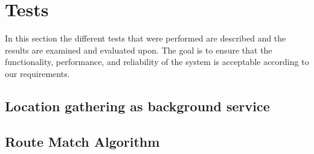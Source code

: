 \section{Tests}\label{sub:s3test}
In this section the different tests that were performed are described and the results are examined and evaluated upon.
The goal is to ensure that the functionality, performance, and reliability of the system is acceptable according to our requirements.

\subsection{Location gathering as background service}\label{subsec:bgstest2}



\subsection{Route Match Algorithm}\label{subsec:algotest}

